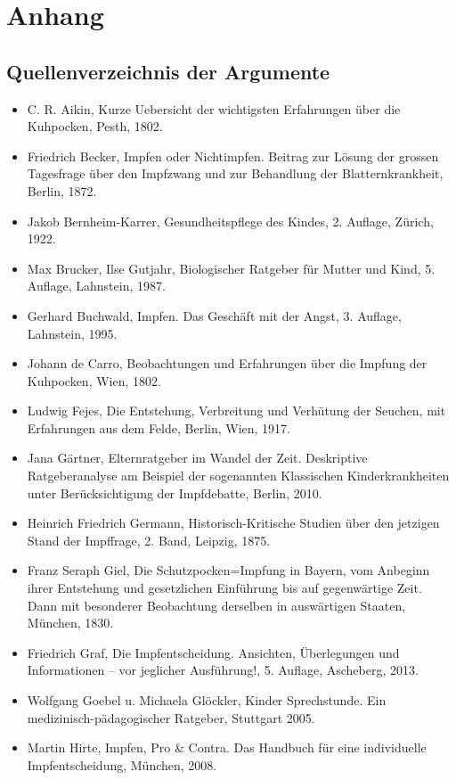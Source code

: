\documentclass[
    a4paper,
    12pt,
    hyphens,
    chapterprefix=true,
    headheight=33pt,
    footheight=29pt,
    headings=optiontohead,
]{scrartcl}
\begin{document}
{\section{Anhang}

\subsection{Quellenverzeichnis der Argumente}
\begin{itemize}
\item{C. R. Aikin, Kurze Uebersicht der wichtigsten Erfahrungen über die Kuhpocken, Pesth, 1802.}
\item{Friedrich Becker, Impfen oder Nichtimpfen. Beitrag zur Lösung der grossen Tagesfrage über den Impfzwang und zur Behandlung der Blatternkrankheit, Berlin, 1872.}
\item{Jakob Bernheim-Karrer, Gesundheitspflege des Kindes, 2. Auflage, Zürich, 1922.}
\item{Max Brucker, Ilse Gutjahr, Biologischer Ratgeber für Mutter und Kind, 5. Auflage, Lahnstein, 1987.}
\item{Gerhard Buchwald, Impfen. Das Geschäft mit der Angst, 3. Auflage, Lahnstein, 1995.}
\item{Johann de Carro, Beobachtungen und Erfahrungen über die Impfung der Kuhpocken, Wien, 1802.}
\item{Ludwig Fejes, Die Entstehung, Verbreitung und Verhütung der Seuchen, mit Erfahrungen aus dem Felde, Berlin, Wien, 1917.}
\item{Jana Gärtner, Elternratgeber im Wandel der Zeit. Deskriptive Ratgeberanalyse am Beispiel der sogenannten Klassischen Kinderkrankheiten unter Berücksichtigung der Impfdebatte, Berlin, 2010.}
\item{Heinrich Friedrich Germann, Historisch-Kritische Studien über den jetzigen Stand der Impffrage, 2. Band, Leipzig, 1875.}
\item{Franz Seraph Giel, Die Schutzpocken=Impfung in Bayern, vom Anbeginn ihrer Entstehung und gesetzlichen Einführung  bis auf gegenwärtige Zeit. Dann mit besonderer Beobachtung derselben in auswärtigen Staaten, München, 1830.}
\item{Friedrich Graf, Die Impfentscheidung. Ansichten, Überlegungen und Informationen -- vor jeglicher Ausführung!, 5. Auflage, Ascheberg, 2013.}
\item{Wolfgang Goebel u. Michaela Glöckler, Kinder Sprechstunde. Ein medizinisch-pädagogischer Ratgeber, Stuttgart 2005.}
\item{Martin Hirte, Impfen, Pro \& Contra. Das Handbuch für eine individuelle \\Impfentscheidung, München, 2008.}

\end{itemize}}
\end{document}
